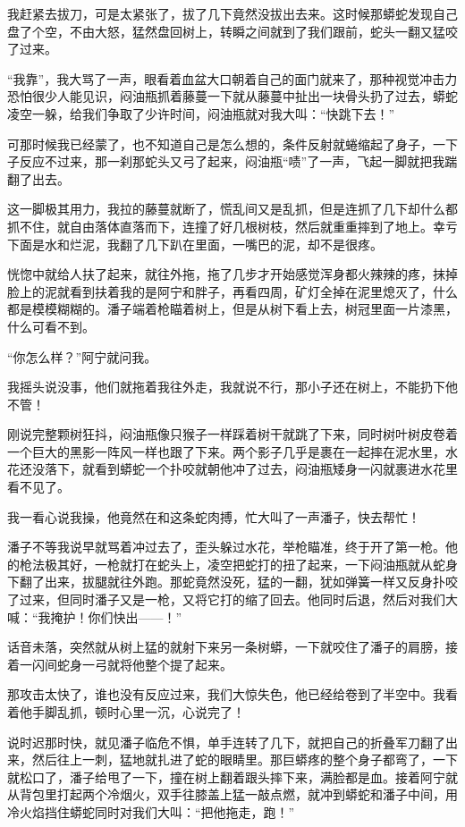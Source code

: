 我赶紧去拔刀，可是太紧张了，拔了几下竟然没拔出去来。这时候那蟒蛇发现自己盘了个空，不由大怒，猛然盘回树上，转瞬之间就到了我们跟前，蛇头一翻又猛咬了过来。

“我靠”，我大骂了一声，眼看着血盆大口朝着自己的面门就来了，那种视觉冲击力恐怕很少人能见识，闷油瓶抓着藤蔓一下就从藤蔓中扯出一块骨头扔了过去，蟒蛇凌空一躲，给我们争取了少许时间，闷油瓶就对我大叫：“快跳下去！”

可那时候我已经蒙了，也不知道自己是怎么想的，条件反射就蜷缩起了身子，一下子反应不过来，那一刹那蛇头又弓了起来，闷油瓶“啧”了一声，飞起一脚就把我踹翻了出去。

这一脚极其用力，我拉的藤蔓就断了，慌乱间又是乱抓，但是连抓了几下却什么都抓不住，就自由落体直落而下，连撞了好几根树枝，然后就重重摔到了地上。幸亏下面是水和烂泥，我翻了几下趴在里面，一嘴巴的泥，却不是很疼。

恍惚中就给人扶了起来，就往外拖，拖了几步才开始感觉浑身都火辣辣的疼，抹掉脸上的泥就看到扶着我的是阿宁和胖子，再看四周，矿灯全掉在泥里熄灭了，什么都是模模糊糊的。潘子端着枪瞄着树上，但是从树下看上去，树冠里面一片漆黑，什么可看不到。

“你怎么样？”阿宁就问我。

我摇头说没事，他们就拖着我往外走，我就说不行，那小子还在树上，不能扔下他不管！

刚说完整颗树狂抖，闷油瓶像只猴子一样踩着树干就跳了下来，同时树叶树皮卷着一个巨大的黑影一阵风一样也跟了下来。两个影子几乎是裹在一起摔在泥水里，水花还没落下，就看到蟒蛇一个扑咬就朝他冲了过去，闷油瓶矮身一闪就裹进水花里看不见了。

我一看心说我操，他竟然在和这条蛇肉搏，忙大叫了一声潘子，快去帮忙！

潘子不等我说早就骂着冲过去了，歪头躲过水花，举枪瞄准，终于开了第一枪。他的枪法极其好，一枪就打在蛇头上，凌空把蛇打的扭了起来，一下闷油瓶就从蛇身下翻了出来，拔腿就往外跑。那蛇竟然没死，猛的一翻，犹如弹簧一样又反身扑咬了过来，但同时潘子又是一枪，又将它打的缩了回去。他同时后退，然后对我们大喊：“我掩护！你们快出——！”

话音未落，突然就从树上猛的就射下来另一条树蟒，一下就咬住了潘子的肩膀，接着一闪间蛇身一弓就将他整个提了起来。

那攻击太快了，谁也没有反应过来，我们大惊失色，他已经给卷到了半空中。我看着他手脚乱抓，顿时心里一沉，心说完了！

说时迟那时快，就见潘子临危不惧，单手连转了几下，就把自己的折叠军刀翻了出来，然后往上一刺，猛地就扎进了蛇的眼睛里。那巨蟒疼的整个身子都弯了，一下就松口了，潘子给甩了一下，撞在树上翻着跟头摔下来，满脸都是血。接着阿宁就从背包里打起两个冷烟火，双手往膝盖上猛一敲点燃，就冲到蟒蛇和潘子中间，用冷火焰挡住蟒蛇同时对我们大叫：“把他拖走，跑！”

